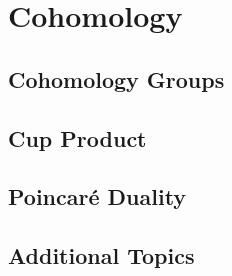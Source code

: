 \chapter{Cohomology}
\section{Cohomology Groups}
\section{Cup Product}
\section{Poincaré Duality}
\section{Additional Topics}

